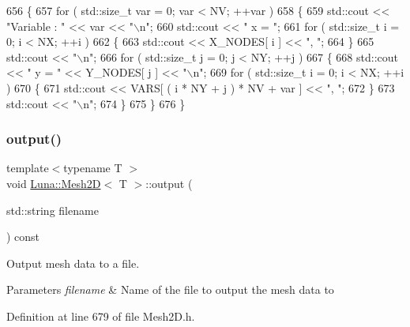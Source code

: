 \begin{DoxyCode}
656   \{
657     \textcolor{keywordflow}{for} ( std::size\_t var = 0; var < NV; ++var )
658     \{
659       std::cout << \textcolor{stringliteral}{"Variable : "} << var << \textcolor{stringliteral}{"\(\backslash\)n"};
660       std::cout << \textcolor{stringliteral}{" x = "};
661       \textcolor{keywordflow}{for} ( std::size\_t i = 0; i < NX; ++i )
662       \{
663         std::cout << X\_NODES[ i ] << \textcolor{stringliteral}{", "};
664       \}
665       std::cout << \textcolor{stringliteral}{"\(\backslash\)n"};
666       \textcolor{keywordflow}{for} ( std::size\_t j = 0; j < NY; ++j )
667       \{
668         std::cout << \textcolor{stringliteral}{" y = "} << Y\_NODES[ j ] << \textcolor{stringliteral}{"\(\backslash\)n"};
669         \textcolor{keywordflow}{for} ( std::size\_t i = 0; i < NX; ++i )
670         \{
671           std::cout << VARS[ ( i * NY + j ) * NV + var ] << \textcolor{stringliteral}{", "};
672         \}
673         std::cout << \textcolor{stringliteral}{"\(\backslash\)n"};
674       \}
675     \}
676   \}
\end{DoxyCode}
\mbox{\label{classLuna_1_1Mesh2D_a02037bbd93a09db9c772528c4a4e8bf3}} 
\subsubsection{\texorpdfstring{output()}{output()}\hspace{0.1cm}{\footnotesize\ttfamily [2/2]}}
{\footnotesize\ttfamily template$<$typename T $>$ \\
void \hyperlink{classLuna_1_1Mesh2D}{Luna\+::\+Mesh2D}$<$ T $>$\+::output (\begin{DoxyParamCaption}\item[{std\+::string}]{filename }\end{DoxyParamCaption}) const}



Output mesh data to a file. 


\begin{DoxyParams}{Parameters}
{\em filename} & Name of the file to output the mesh data to \\
\hline
\end{DoxyParams}


Definition at line 679 of file Mesh2\+D.\+h.


